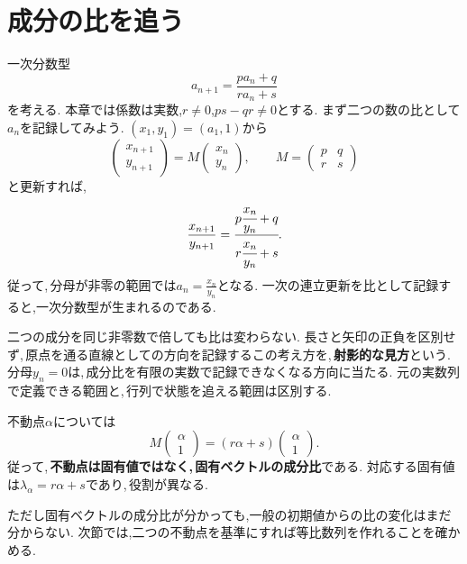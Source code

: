 \section{成分の比を追う}\label{節：成分の比を追う}

一次分数型
\[
 a_{n+1}=\frac{pa_n+q}{ra_n+s}
\]
を考える. 本章では係数は実数,$r\ne0$,$ps-qr\ne0$とする.
まず二つの数の比として$a_n$を記録してみよう.
$(x_1,y_1)=(a_1,1)$から
\[
 \begin{pmatrix}x_{n+1}\\y_{n+1}\end{pmatrix}
 =M\begin{pmatrix}x_n\\y_n\end{pmatrix},
 \qquad
 M=\begin{pmatrix}p&q\\r&s\end{pmatrix}
\]
と更新すれば,
\[
 \frac{x_{n+1}}{y_{n+1}}
 =\cfrac{p\cfrac{x_n}{y_n}+q}{r\cfrac{x_n}{y_n}+s}.
\]
従って,\,分母が非零の範囲では$a_n=\frac{x_n}{y_n}$となる.
一次の連立更新を比として記録すると,一次分数型が生まれるのである.

二つの成分を同じ非零数で倍しても比は変わらない.
長さと矢印の正負を区別せず,\,原点を通る直線としての方向を記録するこの考え方を,\,\textbf{射影的な見方}という.
分母$y_n=0$は,\,成分比を有限の実数で記録できなくなる方向に当たる.
元の実数列で定義できる範囲と,\,行列で状態を追える範囲は区別する.

不動点$\alpha$については
\[
 M\begin{pmatrix}\alpha\\1\end{pmatrix}
 =(r\alpha+s)\begin{pmatrix}\alpha\\1\end{pmatrix}.
\]
従って,\,\textbf{不動点は固有値ではなく,\,固有ベクトルの成分比}である.
対応する固有値は$\lambda_\alpha=r\alpha+s$であり,\,役割が異なる.
\NewFigProjective


ただし固有ベクトルの成分比が分かっても,一般の初期値からの比の変化はまだ分からない.
次節では,二つの不動点を基準にすれば等比数列を作れることを確かめる.
